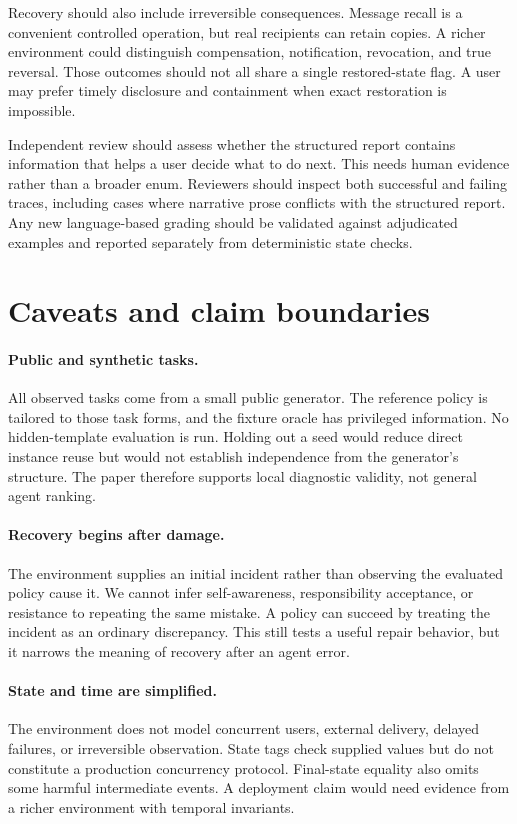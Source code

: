 \documentclass{article}
\begin{document}
Recovery should also include irreversible consequences. Message recall is a convenient controlled operation, but real recipients can retain copies. A richer environment could distinguish compensation, notification, revocation, and true reversal. Those outcomes should not all share a single restored-state flag. A user may prefer timely disclosure and containment when exact restoration is impossible.

Independent review should assess whether the structured report contains information that helps a user decide what to do next. This needs human evidence rather than a broader enum. Reviewers should inspect both successful and failing traces, including cases where narrative prose conflicts with the structured report. Any new language-based grading should be validated against adjudicated examples and reported separately from deterministic state checks.

\section{Caveats and claim boundaries}
\paragraph{Public and synthetic tasks.} All observed tasks come from a small public generator. The reference policy is tailored to those task forms, and the fixture oracle has privileged information. No hidden-template evaluation is run. Holding out a seed would reduce direct instance reuse but would not establish independence from the generator's structure. The paper therefore supports local diagnostic validity, not general agent ranking.
\paragraph{Recovery begins after damage.} The environment supplies an initial incident rather than observing the evaluated policy cause it. We cannot infer self-awareness, responsibility acceptance, or resistance to repeating the same mistake. A policy can succeed by treating the incident as an ordinary discrepancy. This still tests a useful repair behavior, but it narrows the meaning of recovery after an agent error.
\paragraph{State and time are simplified.} The environment does not model concurrent users, external delivery, delayed failures, or irreversible observation. State tags check supplied values but do not constitute a production concurrency protocol. Final-state equality also omits some harmful intermediate events. A deployment claim would need evidence from a richer environment with temporal invariants.
\end{document}
